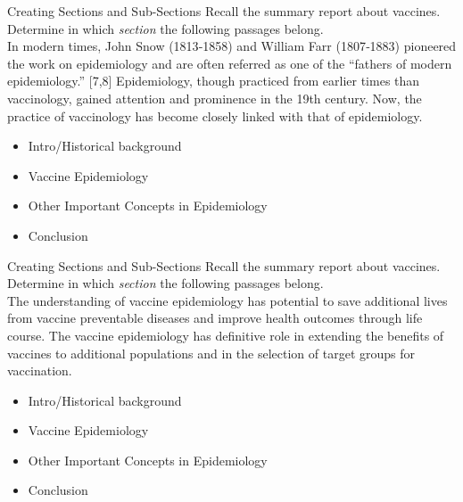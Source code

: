 \documentclass{beamer}
\begin{document}
\begin{frame}{Creating Sections and Sub-Sections}
Recall the summary report about vaccines.  Determine in which \textit{section} the following passages belong. \\ \vspace{0.25cm}
In modern times, John Snow (1813‑1858) and William Farr (1807‑1883) pioneered the work on epidemiology and are often referred as one of the ``fathers of modern epidemiology.'' [7,8] Epidemiology, though practiced from earlier times than vaccinology, gained attention and prominence in the 19th century. Now, the practice of vaccinology has become closely linked with that of epidemiology.
\begin{itemize}
\item Intro/Historical background
\item Vaccine Epidemiology
\item Other Important Concepts in Epidemiology
\item Conclusion
\end{itemize}
\end{frame}

\begin{frame}{Creating Sections and Sub-Sections}
Recall the summary report about vaccines.  Determine in which \textit{section} the following passages belong. \\ \vspace{0.25cm} The understanding of vaccine epidemiology has potential to save additional lives from vaccine preventable diseases and improve health outcomes through life course. The vaccine epidemiology has definitive role in extending the benefits of vaccines to additional populations and in the selection of target groups for vaccination.
\begin{itemize}
\item Intro/Historical background
\item Vaccine Epidemiology
\item Other Important Concepts in Epidemiology
\item Conclusion
\end{itemize}
\end{frame}
\end{document}
